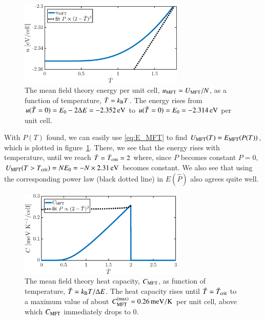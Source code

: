 \begin{figure}[!ht]
\begin{center}
  \includegraphics[width=0.7\textwidth]{../figures/E_MFT} 
  \caption{The mean field theory energy per unit cell,
    $u_{\text{MFT}}=U_{\text{MFT}}/N$, as a function of temperature,
    $\bar{T}=k_\mathrm{B} T$. The energy rises from
    $u(\bar{T}=0)=E_0-2\Delta{E}=\unit[-2.352]{eV}$ to
    $u(\bar{T}=0)=E_0=\unit[-2.314]{eV}$ per unit cell. }
  \label{fig:T1:E}
\end{center}
\end{figure}

With $P(T)$ found, we can easily use \eqref{eq:E_MFT} to find
$U_{\text{MFT}}(T)=E_{\text{MFT}}(P(T))$, which is plotted in
figure~\ref{fig:T1:E}. There, we see that the energy rises with
temperature, until we reach $\bar{T}=\bar{T}_{\rm crit}=2$ where,
since $P$ becomes constant $P=0$, $U_{\MFT}(T>T_{\rm crit})=N
E_0=-N\times\unit[2.31]{eV}$ becomes constant. We also see that using
the corresponding power law (black dotted line) in $E(\hat{P})$ also
agrees quite well. 

\begin{figure}[!ht]
\begin{center}
  \includegraphics[width=0.7\textwidth]{../figures/C_MFT} 
  \caption{The mean field theory heat capacity, $C_{\text{MFT}}$, as
    function of temperature, $\bar{T}=k_\mathrm{B} T/\Delta{E}$. The heat
    capacity rises until $\bar{T}=\bar{T}_{\rm crit}$ to a maximum
    value of about $C_{\MFT}^{(\max)}=\unit[0.26]{meV/K}$ per unit
    cell, above which $C_{\text{MFT}}$ immediately drops to $0$.}
  \label{fig:T1:C}
\end{center}
\end{figure}

